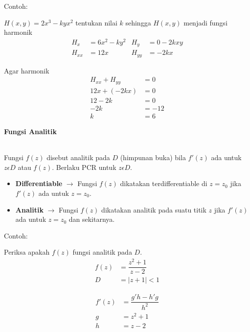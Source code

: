 \documentclass{article}
\begin{document}
Contoh:

$H(x,y) =2x^3 -kyx^2$ tentukan nilai $k$ sehingga $H(x,y)$ menjadi fungsi harmonik
\begin{align}
    H_x    & = 6x^2-ky^2 & H_y    & = 0-2kxy
    \nonumber                                \\
    H_{xx} & = 12x       & H_{yy} & = -2kx
    \nonumber
\end{align}

Agar harmonik
\begin{align}
    H_{xx} + H_{yy} & = 0
    \nonumber               \\
    12x + (-2kx)    & = 0
    \nonumber               \\
    12 - 2k         & = 0
    \nonumber               \\
    -2k             & = -12
    \nonumber               \\
    k               & = 6
    \nonumber
\end{align}



\newpage
\begin{center}
    \textbf{Fungsi Analitik}
\end{center}
\leavevmode\\

Fungsi $f(z)$ disebut analitik pada $D$ (himpunan buka) bila $f'(z)$ ada untuk $z \epsilon D$ atau $f(z)$. Berlaku PCR untuk $z \epsilon D$.
\begin{itemize}
    \item \textbf{Differentiable} $\rightarrow$ Fungsi $f(z)$ dikatakan terdifferentiable di $z=z_0$ jika $f'(z)$ ada untuk $z=z_0$.
    \item \textbf{Analitik} $\rightarrow$ Fungsi $f(z)$ dikatakan analitik pada suatu titik $z$ jika $f'(z)$ ada untuk $z=z_0$ dan sekitarnya.
\end{itemize}

Contoh:

Periksa apakah $f(z)$ fungsi analitik pada $D$.
\begin{align}
    f(z) & = \dfrac{z^2 + 1}{z - 2}
    \nonumber                       \\
    D    & = |z + 1| < 1
    \nonumber
\end{align}

\begin{align}
    f'(z) & = \dfrac{g'h - h'g}{h^2}
    \nonumber                        \\
    g     & = z^2+1
    \nonumber                        \\
    h     & = z-2
    \nonumber
\end{align}
\end{document}
